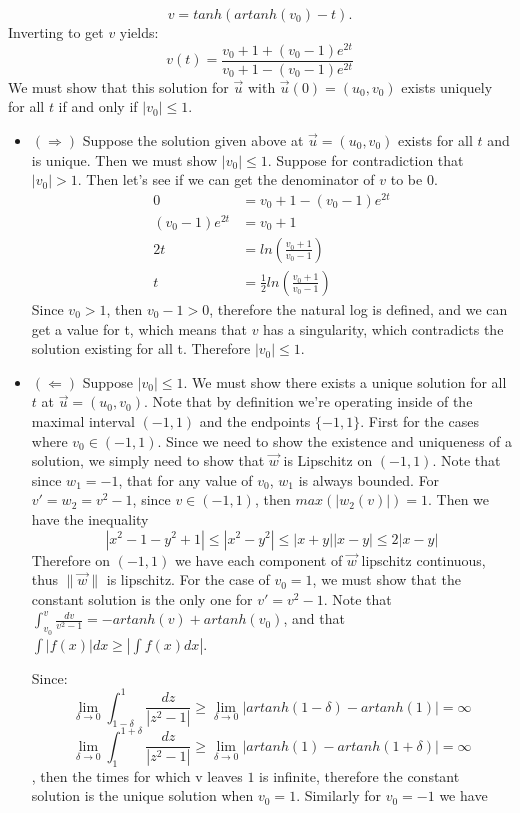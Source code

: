 \documentclass[12pt, letterpaper]{article}
\begin{document}
\begin{enumerate}
\begin{enumerate}
			$$
				v = tanh(artanh(v_0) - t).			
			$$
			\fi
			Inverting to get $v$ yields:
		$$
			v(t) = \frac{v_0+1+(v_0-1)e^{2t}}{v_0+1-(v_0-1)e^{2t}}		
		$$
			We must show that this solution for $\Vec{u}$ with $\Vec{u}(0) = (u_0,v_0)$ exists uniquely for all $t$ if and only if $|v_0| \leq 1$.
			\begin{itemize}
				\item $(\Rightarrow)$  Suppose the solution given above at $\Vec{u} = (u_0, v_0)$ exists for all $t$ and is unique.  Then we must show $|v_0| \leq 1$.  Suppose for contradiction that $|v_0| > 1$. Then let's see if we can get the denominator of $v$ to be $0$.  
				\begin{align*}
					0 &= v_0 + 1 - (v_0-1)e^{2t}\\
					(v_0-1)e^{2t} &= v_0 + 1\\
					2t &= ln \left( \frac{v_0 + 1}{v_0-1} \right)\\
					t &=\frac{1}{2} ln \left( \frac{v_0 + 1}{v_0-1} \right)
				\end{align*}										Since $v_0 > 1$, then $v_0 - 1 > 0$, therefore the natural log is defined, and we can get a value for t, which means that $v$ has a singularity, which contradicts the solution existing for all t.
				  Therefore $|v_0| \leq 1$.
				\item $(\Leftarrow)$  Suppose $|v_0| \leq 1$.  We must show there exists a unique solution for all $t$ at $\Vec{u} = (u_0, v_0)$. Note that by definition we're operating inside of the maximal interval $(-1,1)$ and the endpoints $\{-1,1\}$.  First for the cases where $v_0 \in (-1,1)$.  Since we need to show the existence and uniqueness of a solution, we simply need to show that $\Vec{w}$ is Lipschitz on $(-1,1)$.  Note that since $w_1 = -1$, that for any value of $v_0$, $w_1$ is always bounded.  For $v' = w_2 = v^2 -1$, since $v\in (-1,1)$, then $max(|w_2(v)|) = 1$.  Then we have the inequality 
				$$				
				|x^2 - 1 -y^2 + 1| \leq |x^2 - y^2| \leq |x+y| |x-y| \leq 2|x-y|
				$$
				Therefore on $(-1,1)$ we have each component of $\Vec{w}$ lipschitz continuous, thus $\|\Vec{w}\|$ is lipschitz.  For the case of $v_0 = 1$, we must show that the constant solution is the only one for $v' = v^2 - 1$.  Note that $\int_{v_0}^v \frac{dv}{v^2 -1} = -artanh(v) + artanh(v_0)$, and that $\int |f(x)| dx \geq | \int f(x) dx |$.
				
				Since: $$\lim_{\delta \to 0} \int_{1-\delta}^1 \frac{dz}{|z^2-1|} \geq \lim_{\delta \to 0} |artanh(1-\delta) - artanh(1)| = \infty 
				$$
				$$ \lim_{\delta \to 0} \int_{1}^{1+\delta} \frac{dz}{|z^2-1|} \geq \lim_{\delta \to 0} |artanh(1) - artanh(1+\delta)| = \infty  $$, then the times for which v leaves $1$ is infinite, therefore the constant solution is the unique solution when $v_0 = 1$.  Similarly for $v_0 = -1$ we have 
				

\end{itemize}
\end{enumerate}
\end{enumerate}
\end{document}
